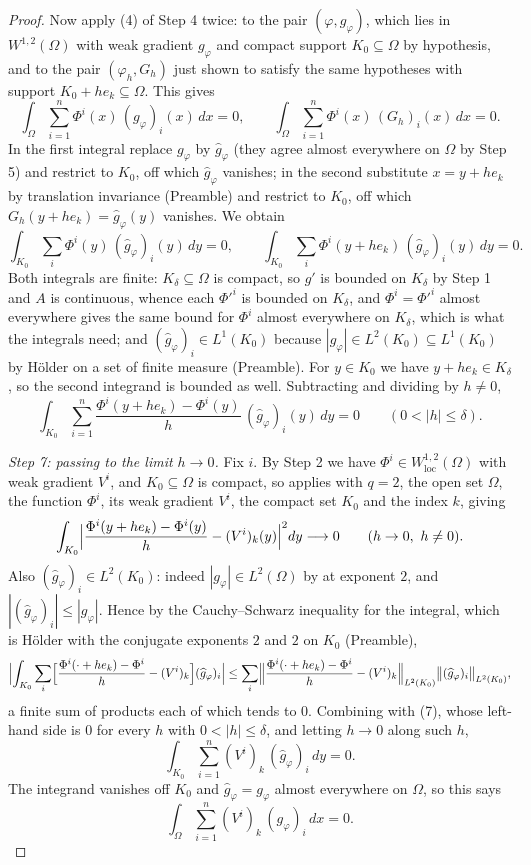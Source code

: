\begin{proof}
Now apply (4) of Step 4 twice: to the pair $(\varphi,g_\varphi)$, which lies in
$W^{1,2}(\Omega)$ with weak gradient $g_\varphi$ and compact support
$K_0\subseteq\Omega$ by hypothesis, and to the pair $(\varphi_h,G_h)$ just
shown to satisfy the same hypotheses with support $K_0+he_k\subseteq\Omega$.
This gives
\[
\int_\Omega\sum_{i=1}^n\Phi^i(x)\,(g_\varphi)_i(x)\,dx=0,
\qquad
\int_\Omega\sum_{i=1}^n\Phi^i(x)\,(G_h)_i(x)\,dx=0 .
\]
In the first integral replace $g_\varphi$ by $\widehat g_\varphi$ (they agree
almost everywhere on $\Omega$ by Step 5) and restrict to $K_0$, off which
$\widehat g_\varphi$ vanishes; in the second substitute $x=y+he_k$ by
translation invariance (Preamble) and restrict to $K_0$, off which $G_h(y+he_k)
=\widehat g_\varphi(y)$ vanishes.  We obtain
\[
\int_{K_0}\sum_i\Phi^i(y)\,(\widehat g_\varphi)_i(y)\,dy=0,
\qquad
\int_{K_0}\sum_i\Phi^i(y+he_k)\,(\widehat g_\varphi)_i(y)\,dy=0 .
\]
Both integrals are finite: $K_\delta\subseteq\Omega$ is compact, so $g'$ is
bounded on $K_\delta$ by Step 1 and $A$ is continuous, whence each $\Phi'^i$ is
bounded on $K_\delta$, and $\Phi^i=\Phi'^i$ almost everywhere gives the same
bound for $\Phi^i$ almost everywhere on $K_\delta$, which is what the
integrals need; and $(\widehat g_\varphi)_i\in L^1(K_0)$ because
$|g_\varphi|\in L^2(K_0)\subseteq L^1(K_0)$ by H\"older on a set of finite
measure (Preamble).  For
$y\in K_0$ we have $y+he_k\in K_\delta$, so the second integrand is bounded as
well.  Subtracting and dividing by $h\ne0$,
\[
\int_{K_0}\sum_{i=1}^n\frac{\Phi^i(y+he_k)-\Phi^i(y)}{h}\,(\widehat
g_\varphi)_i(y)\,dy=0
\qquad(0<|h|\le\delta).
\tag{7}
\]

\emph{Step 7: passing to the limit $h\to0$.}  Fix $i$.  By Step 2 we have
$\Phi^i\in W^{1,2}_{\mathrm{loc}}(\Omega)$ with weak gradient $V^i$, and
$K_0\subseteq\Omega$ is compact, so
 applies with $q=2$, the open set
$\Omega$, the function $\Phi^i$, its weak gradient $V^i$, the compact set $K_0$
and the index $k$, giving
\[
\int_{K_0}\Bigl|\frac{\Phi^i(y+he_k)-\Phi^i(y)}{h}-(V^i)_k(y)\Bigr|^2dy
\longrightarrow0\qquad(h\to0,\ h\ne0).
\]
Also $(\widehat g_\varphi)_i\in L^2(K_0)$: indeed $|g_\varphi|\in L^2(\Omega)$ by
 at exponent $2$, and $|(\widehat g_\varphi)_i|\le|g_\varphi|$.
Hence by the Cauchy--Schwarz inequality for the integral, which is H\"older with
the conjugate exponents $2$ and $2$ on $K_0$ (Preamble),
\[
\Bigl|\int_{K_0}\sum_i\Bigl[\frac{\Phi^i(\cdot+he_k)-\Phi^i}{h}-(V^i)_k\Bigr]
(\widehat g_\varphi)_i\Bigr|
\le\sum_i\Bigl\|\frac{\Phi^i(\cdot+he_k)-\Phi^i}{h}-(V^i)_k\Bigr\|_{L^2(K_0)}
\bigl\|(\widehat g_\varphi)_i\bigr\|_{L^2(K_0)},
\]
a finite sum of products each of which tends to $0$.  Combining with (7), whose
left-hand side is $0$ for every $h$ with $0<|h|\le\delta$, and letting $h\to0$
along such $h$,
\[
\int_{K_0}\sum_{i=1}^n(V^i)_k\,(\widehat g_\varphi)_i\,dy=0 .
\]
The integrand vanishes off $K_0$ and $\widehat g_\varphi=g_\varphi$ almost
everywhere on $\Omega$, so this says
\[
\int_\Omega\sum_{i=1}^n(V^i)_k\,(g_\varphi)_i\,dx=0 .
\tag{8}
\]


\end{proof}
